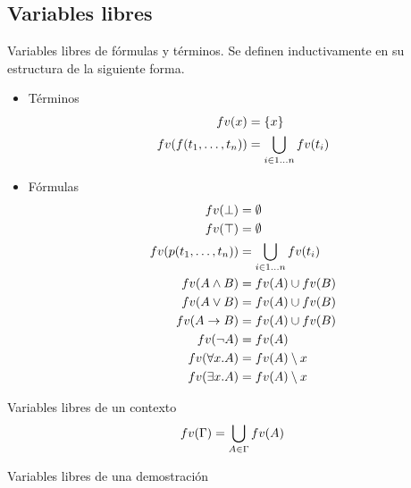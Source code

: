 \subsection{Variables libres}

\begin{definition}{Variables libres de fórmulas y términos}. Se definen inductivamente en su estructura de la siguiente forma.

    \begin{itemize}
        \item Términos
        \begin{align*}
            fv(x) &= \{ x \}\\
            fv(f(t_1, \dots, t_n)) &= \bigcup_{i \in 1\dots n} fv(t_i) 
        \end{align*}
    
        \item Fórmulas
        \begin{align*}    
            fv(\bot) &=\emptyset\\
            fv(\top) &=\emptyset \\
            fv(p(t_1, \dots, t_n)) &= \bigcup_{i \in 1\dots n} fv(t_i) \\
            fv(A \wedge B) &= fv(A) \cup fv(B)\\
            fv(A \vee B) &=fv(A) \cup fv(B)\\
            fv(A \to B) &=fv(A) \cup fv(B)\\
            fv(\neg A) &=fv(A)\\
            fv(\forall x . A) &= fv(A) \setminus x \\
            fv(\exists x . A) &= fv(A) \setminus x
        \end{align*}

    \end{itemize}
\end{definition}

\begin{definition}{Variables libres de un contexto}
    \[
        fv(\Gamma) = \bigcup_{A \in \Gamma} fv(A)
    \]
\end{definition}

\begin{definition}{Variables libres de una demostración}
    
\end{definition}
